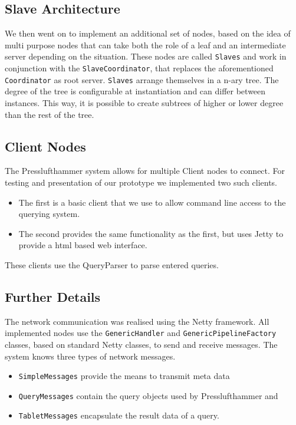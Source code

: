     
  \subsection{Slave Architecture}
    We then went on to implement an additional set of nodes, based on the
    idea of multi purpose nodes that can take both the role of a leaf
    and an intermediate server depending on the situation.
    These nodes are called \texttt{Slaves} and work in conjunction with the
    \texttt{SlaveCoordinator}, that replaces the aforementioned 
    \texttt{Coordinator} as root server.
    \texttt{Slaves} arrange themselves in a n-ary tree.
    The degree of the tree is configurable at instantiation
    and can differ between instances.
    This way, it is possible to create subtrees of higher or lower degree
    than the rest of the tree.


  \subsection{Client Nodes}
    The Presslufthammer system allows for multiple Client nodes to connect.
    For testing and presentation of our prototype we implemented two such
    clients.
    \begin{itemize}
      \item The first is a basic client that we use to allow command
            line access to the querying system.
      \item The second provides the same functionality as the first,
            but uses Jetty \cite{jetty} to provide a html based web
            interface.
    \end{itemize}
    These clients use the QueryParser to parse entered queries.


  \subsection{Further Details}
    The network communication was realised using the Netty framework.
    All implemented nodes use the \texttt{GenericHandler} and
    \texttt{GenericPipelineFactory} classes, based on standard Netty classes,
    to send and receive messages.
    The system knows three types of network messages.
    \begin{itemize}
      \item \texttt{SimpleMessages} provide the means to transmit meta data
      \item \texttt{QueryMessages} contain the query objects used by
        Presslufthammer and
      \item \texttt{TabletMessages} encapsulate the result data of a query.
    \end{itemize}
    

